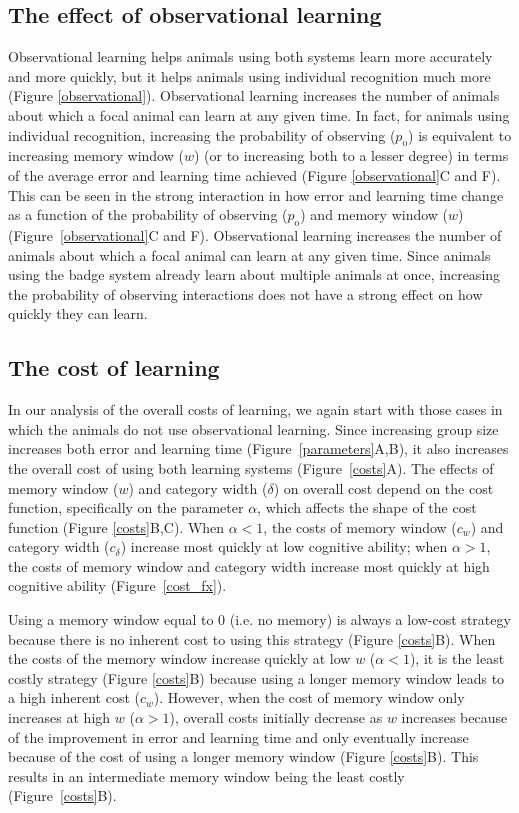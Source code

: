 \subsection*{The effect of observational learning}
Observational learning helps animals using both systems learn more accurately and more quickly, but it helps animals using individual recognition much more (Figure \ref{observational}). Observational learning increases the number of animals about which a focal animal can learn at any given time. In fact, for animals using individual recognition, increasing the probability of observing ($p_\text{o}$) is equivalent to increasing memory window ($w$) (or to increasing both to a lesser degree) in terms of the average error and learning time achieved (Figure \ref{observational}C and F). This can be seen in the strong interaction in how error and learning time change as a function of the probability of observing ($p_\text{o}$) and memory window ($w$) (Figure~\ref{observational}C and F).
Observational learning increases the number of animals about which a focal animal can learn at any given time. Since animals using the badge system already learn about multiple animals at once, increasing the probability of observing interactions does not have a strong effect on how quickly they can learn.

%
\subsection*{The cost of learning} 
In our analysis of the overall costs of learning, we again start with those cases in which the animals do not use observational learning. Since increasing group size increases both error and learning time (Figure~\ref{parameters}A,B), it also increases the overall cost of using both learning systems (Figure~\ref{costs}A). The effects of memory window ($w$) and category width ($\delta$) on overall cost depend on the cost function, specifically on the parameter $\alpha$, which affects the shape of the cost function (Figure \ref{costs}B,C). When $\alpha<1$, the costs of memory window ($c_w$) and category width ($c_\delta$) increase most quickly at low cognitive ability; when $\alpha>1$, the costs of memory window and category width increase most quickly at high cognitive ability (Figure~\ref{cost_fx}). 

Using a memory window equal to $0$ (i.e. no memory) is always a low-cost strategy because there is no inherent cost to using this strategy (Figure \ref{costs}B). When the costs of the memory window increase quickly at low $w$ ($\alpha<1$), it is the least costly strategy (Figure \ref{costs}B) because using a longer memory window leads to a high inherent cost ($c_w$). However, when the cost of memory window only increases at high $w$ ($\alpha>1$), overall costs initially decrease as $w$ increases because of the improvement in error and learning time and only eventually increase because of the cost of using a longer memory window (Figure \ref{costs}B). This results in an intermediate memory window being the least costly (Figure~\ref{costs}B).

